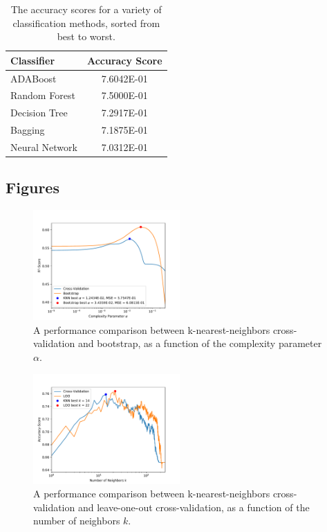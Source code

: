\documentclass[twoside,twocolumn,10pt]{revtex4-1}
\begin{document}
	\begin{table}[H]
	\center
		\begin{tabular}{l c}
		\textbf{Classifier} & \textbf{Accuracy Score} \\
		\hline
		ADABoost        &       7.6042E-01  \\ 
	   	Random Forest   &       7.5000E-01   \\
	   	Decision Tree   &       7.2917E-01   \\
	   	Bagging         &       7.1875E-01   \\
	   	Neural Network  &      7.0312E-01
		\end{tabular}
		\caption{The accuracy scores for a variety of classification methods, sorted from best to worst.  \label{table_10}}
	\end{table}
	
	\subsection{Figures}
	
	\begin{figure}[H]
	\centering  
	\includegraphics[width = 0.5\textwidth]{plot_1.pdf}
	\caption{A performance comparison between k-nearest-neighbors cross-validation and bootstrap, as a function of the complexity parameter $\alpha$.\label{fig_1}}
	\end{figure}
	
	\begin{figure}[H]
	\centering  
	\includegraphics[width = 0.5\textwidth]{plot_2.pdf}
	\caption{A performance comparison between k-nearest-neighbors cross-validation and leave-one-out cross-validation, as a function of the number of neighbors $k$.\label{fig_2}}
	\end{figure}
	
\end{document}
